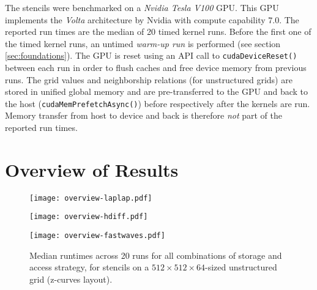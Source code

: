 The stencils were benchmarked on a \emph{Nvidia Tesla V100} GPU. This GPU implements the \emph{Volta} architecture by Nvidia with compute capability $7.0$. The reported run times are the median of 20 timed kernel runs. Before the first one of the timed kernel runs, an untimed \emph{warm-up run} is performed (see section \ref{sec:foundations}). The GPU is reset using an API call to \texttt{cudaDeviceReset()} between each run in order to flush caches and free device memory from previous runs. The grid values and neighborship relations (for unstructured grids) are stored in unified global memory and are pre-transferred to the GPU and back to the host (\texttt{cudaMemPrefetchAsync()}) before respectively after the kernels are run. Memory transfer from host to device and back is therefore \emph{not} part of the reported run times.

\section{Overview of Results}

\begin{figure}
	
	\texttt{[image: overview-laplap.pdf]}
	
	\vspace{0.5cm}
	
	\texttt{[image: overview-hdiff.pdf]}
	
	\vspace{0.5cm}
	
	\texttt{[image: overview-fastwaves.pdf]}
	
	\caption{\label{fig:storage-access} Median runtimes across 20 runs for all combinations of storage and access strategy, for stencils on a $512\times512\times 64$-sized unstructured grid (z-curves layout).}
\end{figure}

